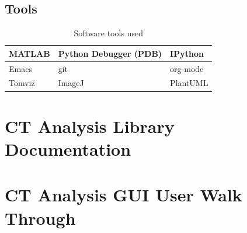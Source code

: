 \documentclass[11pt]{report}
\begin{document}
\subsection{Tools}
\label{sec:orgeea2804}
\begin{table}[htbp]
\caption{\label{tab:orgef2ed89}
Software tools used}
\centering
\begin{tabularx}{\textwidth}{|X|X|X|}
\hline
MATLAB & Python Debugger (PDB) & IPython\\
\hline
Emacs & git & org-mode\\
\hline
Tomviz & ImageJ & PlantUML\\
\hline
\end{tabularx}
\end{table}

\section{CT Analysis Library Documentation}
\label{sec:org75daf02}
\clearpage













\section{CT Analysis GUI User Walk Through}
\label{sec:orgc126ef9}





\end{document}
